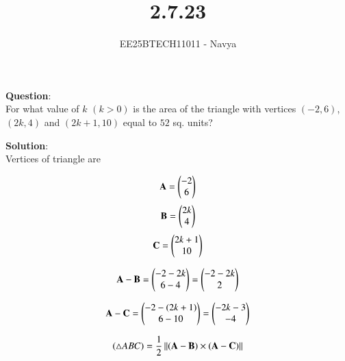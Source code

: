 \documentclass[journal]{IEEEtran}
\begin{document}

\vspace{3cm}

\title{2.7.23}
\author{EE25BTECH11011 - Navya }
\maketitle
{\let\newpage\relax\maketitle}

\renewcommand{\thefigure}{\theenumi}
\renewcommand{\thetable}{\theenumi}
\setlength{\intextsep}{10pt} %


\renewcommand{\thetable}{\theenumi}

\textbf{Question}:\\
For what value of $k$ $(k>0)$ is the area of the triangle with vertices $(-2,6)$, $(2k,4)$ and $(2k+1,10)$ equal to $52$ sq. units?

\textbf{Solution}:\\
Vertices of triangle are

\begin{align}
\mathbf{A} = \begin{pmatrix}-2 \\ 6\end{pmatrix}
\end{align}
\begin{align}
\mathbf{B} = \begin{pmatrix}2k \\ 4\end{pmatrix}
\end{align}
\begin{align}
\mathbf{C} = \begin{pmatrix}2k+1 \\ 10\end{pmatrix}
\end{align}

\begin{align}
\mathbf{A}-\mathbf{B} 
= \begin{pmatrix}-2-2k \\ 6-4\end{pmatrix} = \begin{pmatrix}-2-2k \\ 2\end{pmatrix}
\end{align}


\begin{align}
\mathbf{A} - \mathbf{C} = \begin{pmatrix}-2-(2k+1) \\ 6-10\end{pmatrix} = \begin{pmatrix}-2k-3 \\-4 \end{pmatrix}
\end{align}



\begin{align}
(\triangle ABC)=\frac{1}{2}\left\lVert(\mathbf{A}-\mathbf{B}) \times (\mathbf{A}-\mathbf{C})\right\rVert
\end{align}
\end{document}
